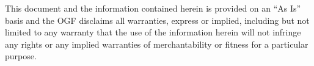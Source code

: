 This document and the information contained herein is provided on an
``As Is'' basis and the OGF disclaims all warranties, express or
implied, including but not limited to any warranty that the use of the
information herein will not infringe any rights or any implied
warranties of merchantability or fitness for a particular purpose.
